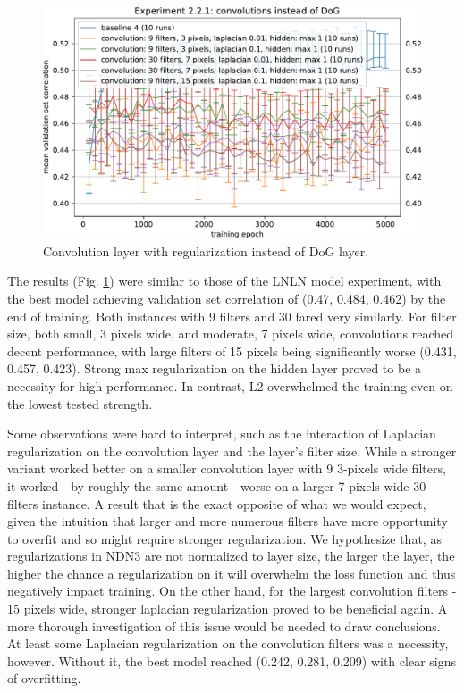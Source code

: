 \begin{figure}[H]
    \centering
    \includegraphics[width=1\textwidth]{../figures/05_2_2_1}
    \caption[Experiment 2.2.1]{Convolution layer with regularization instead of DoG layer.}
    \label{fig:5.2.2.1}
\end{figure}

The results (Fig. \ref{fig:5.2.2.1}) were similar to those of the LNLN model experiment, with the best model achieving validation set correlation of (0.47, 0.484, 0.462) by the end of training. Both instances with 9 filters and 30 fared very similarly. For filter size, both small, 3 pixels wide, and moderate, 7 pixels wide, convolutions reached decent performance, with large filters of 15 pixels being significantly worse (0.431, 0.457, 0.423). Strong max regularization on the hidden layer proved to be a necessity for high performance. In contrast, L2 overwhelmed the training even on the lowest tested strength. 

Some observations were hard to interpret, such as the interaction of Laplacian regularization on the convolution layer and the layer’s filter size. While a stronger variant worked better on a smaller convolution layer with 9 3-pixels wide filters, it worked - by roughly the same amount - worse on a larger 7-pixels wide 30 filters instance. A result that is the exact opposite of what we would expect, given the intuition that larger and more numerous filters have more opportunity to overfit and so might require stronger regularization. We hypothesize that, as regularizations in NDN3 are not normalized to layer size, the larger the layer, the higher the chance a regularization on it will overwhelm the loss function and thus negatively impact training. On the other hand, for the largest convolution filters - 15 pixels wide, stronger laplacian regularization proved to be beneficial again. A more thorough investigation of this issue would be needed to draw conclusions. At least some Laplacian regularization on the convolution filters was a necessity, however. Without it, the best model reached (0.242, 0.281, 0.209) with clear signs of overfitting.

